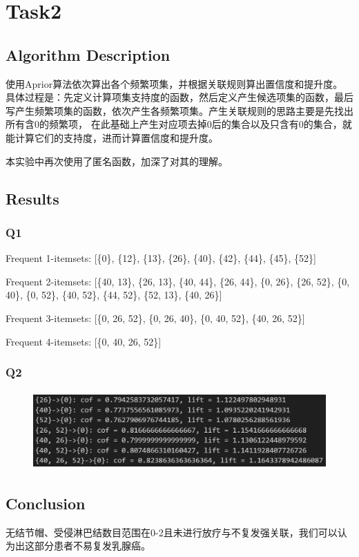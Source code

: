 \documentclass{ctexart}
\begin{document}
    \section{Task2}
    \subsection{Algorithm Description}
	使用Aprior算法依次算出各个频繁项集，并根据关联规则算出置信度和提升度。
具体过程是：先定义计算项集支持度的函数，然后定义产生候选项集的函数，最后写产生频繁项集的函数，依次产生各频繁项集。产生关联规则的思路主要是先找出所有含0的频繁项，
在此基础上产生对应项去掉0后的集合以及只含有0的集合，就能计算它们的支持度，进而计算置信度和提升度。
	
本实验中再次使用了匿名函数，加深了对其的理解。
\subsection{Results}
\subsubsection{Q1}
Frequent 1-itemsets: [\{0\}, \{12\}, \{13\}, \{26\}, \{40\}, \{42\}, \{44\}, \{45\}, \{52\}]

Frequent 2-itemsets: [\{40, 13\}, \{26, 13\}, \{40, 44\}, \{26, 44\}, \{0, 26\}, \{26, 52\}, \{0, 40\}, \{0, 52\}, \{40, 52\}, \{44, 52\}, \{52, 13\}, \{40, 26\}]

Frequent 3-itemsets: [\{0, 26, 52\}, \{0, 26, 40\}, \{0, 40, 52\}, \{40, 26, 52\}]

Frequent 4-itemsets: [\{0, 40, 26, 52\}]

\subsubsection{Q2}
\begin{figure}[H]
	\centering 
	\includegraphics[height=3cm,width=12cm]{4.png}
	\end{figure}

   \subsection{Conclusion}	
   无结节帽、受侵淋巴结数目范围在0-2且未进行放疗与不复发强关联，我们可以认为出这部分患者不易复发乳腺癌。
\end{document}

